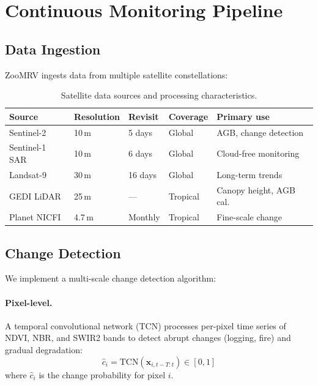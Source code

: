 \section{Continuous Monitoring Pipeline}

\label{sec:monitoring}

\subsection{Data Ingestion}

ZooMRV ingests data from multiple satellite constellations:

\begin{table}[H]
\centering
\caption{Satellite data sources and processing characteristics.}
\label{tab:satellites}
\begin{tabular}{p{3cm}p{2cm}p{2cm}p{2cm}p{2.5cm}}
\toprule
\textbf{Source} & \textbf{Resolution} & \textbf{Revisit} &
  \textbf{Coverage} & \textbf{Primary use} \\
\midrule
Sentinel-2 & 10\,m & 5 days & Global & AGB, change detection \\
Sentinel-1 SAR & 10\,m & 6 days & Global & Cloud-free monitoring \\
Landsat-9 & 30\,m & 16 days & Global & Long-term trends \\
GEDI LiDAR & 25\,m & --- & Tropical & Canopy height, AGB cal. \\
Planet NICFI & 4.7\,m & Monthly & Tropical & Fine-scale change \\
\bottomrule
\end{tabular}
\end{table}

\subsection{Change Detection}

We implement a multi-scale change detection algorithm:

\paragraph{Pixel-level.} A temporal convolutional network (TCN) processes
per-pixel time series of NDVI, NBR, and SWIR2 bands to detect abrupt
changes (logging, fire) and gradual degradation:
\begin{equation}
  \hat{c}_i = \text{TCN}(\mathbf{x}_{i,t-T:t}) \in [0,1]
\end{equation}
where $\hat{c}_i$ is the change probability for pixel $i$.


